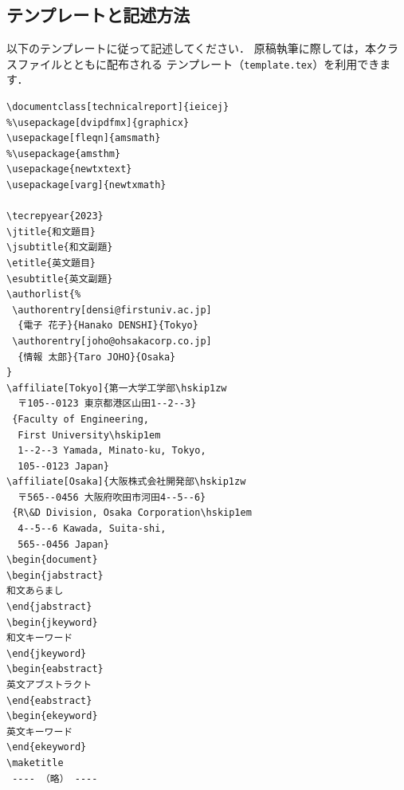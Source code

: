\documentclass[technicalreport]{ieicej}
\begin{document}
\subsection{テンプレートと記述方法}
\label{sec:technicalreport}

以下のテンプレートに従って記述してください．
原稿執筆に際しては，本クラスファイルとともに配布される
テンプレート（\texttt{template.tex}）を利用できます．

\begin{verbatim}
\documentclass[technicalreport]{ieicej}
%\usepackage[dvipdfmx]{graphicx}
\usepackage[fleqn]{amsmath}
%\usepackage{amsthm}
\usepackage{newtxtext}
\usepackage[varg]{newtxmath}

\tecrepyear{2023}
\jtitle{和文題目}
\jsubtitle{和文副題}
\etitle{英文題目}
\esubtitle{英文副題}
\authorlist{%
 \authorentry[densi@firstuniv.ac.jp]
  {電子 花子}{Hanako DENSHI}{Tokyo}
 \authorentry[joho@ohsakacorp.co.jp]
  {情報 太郎}{Taro JOHO}{Osaka}
}
\affiliate[Tokyo]{第一大学工学部\hskip1zw
  〒105--0123 東京都港区山田1--2--3}
 {Faculty of Engineering, 
  First University\hskip1em
  1--2--3 Yamada, Minato-ku, Tokyo,
  105--0123 Japan}
\affiliate[Osaka]{大阪株式会社開発部\hskip1zw
  〒565--0456 大阪府吹田市河田4--5--6}
 {R\&D Division, Osaka Corporation\hskip1em
  4--5--6 Kawada, Suita-shi,
  565--0456 Japan}
\begin{document}
\begin{jabstract}
和文あらまし
\end{jabstract}
\begin{jkeyword}
和文キーワード
\end{jkeyword}
\begin{eabstract}
英文アブストラクト
\end{eabstract}
\begin{ekeyword}
英文キーワード
\end{ekeyword}
\maketitle
 ---- （略） ----
\end{verbatim}
\end{document}
